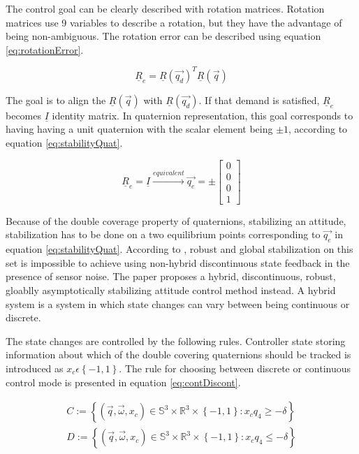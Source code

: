 The control goal can be clearly described with rotation matrices. Rotation matrices use 9 variables to describe a rotation, but they have the advantage of being non-ambiguous. The rotation error can be described using equation \ref{eq:rotationError}. 

\begin{equation}
\label{eq:rotationError}
\underline{R}_e = \underline{R}(\vec{q_d})^T \underline{R}(\vec{q})
\end{equation}

The goal is to align the $\underline{R}(\vec{q})$ with $\underline{R}(\vec{q_d})$. If that demand is satisfied, $\underline{R}_e$ becomes $\underline{I}$ identity matrix. In quaternion representation, this goal corresponds to having having a unit quaternion with the scalar element being $\pm 1$, according to equation \ref{eq:stabilityQuat}. 

\begin{equation}
\label{eq:stabilityQuat}
\underline{R}_e = \underline{I} \xrightarrow{equivalent} \vec{q_e}  = \pm	\begin{bmatrix}
0 \\
0 \\
0 \\
1
\end{bmatrix} 	
\end{equation}

Because of the double coverage property of quaternions, stabilizing an attitude, stabilization has to be done on a two equilibrium points corresponding to $\vec{q_e}$ in equation \ref{eq:stabilityQuat}. According to \cite{globalAttController}, robust and global stabilization on this set is impossible to achieve using non-hybrid discontinuous state feedback in the presence of sensor noise. The paper proposes a hybrid, discontinuous, robust, gloablly asymptotically stabilizing attitude control method instead. A hybrid system is a system in which state changes can vary between being continuous or discrete.

The state changes are controlled by the following rules. Controller state storing information about which of the double covering quaternions should be tracked is introduced as $x_c \epsilon  \left\lbrace -1,1 \right\rbrace $. The rule for choosing between discrete or continuous control mode is presented in equation \ref{eq:contDiscont}.

\begin{align}
\label{eq:contDiscont}
C:= \left\lbrace (\vec{q},\vec{\omega},x_c) \in \mathbb{S}^3 \times \mathbb{R}^3 \times \left\lbrace -1,1 \right\rbrace : x_c q_4 \geq -\delta \right\rbrace  \\
\nonumber D:= \left\lbrace (\vec{q},\vec{\omega},x_c) \in \mathbb{S}^3 \times \mathbb{R}^3 \times \left\lbrace -1,1 \right\rbrace : x_cq_4 \leq -\delta \right\rbrace 
\end{align}

